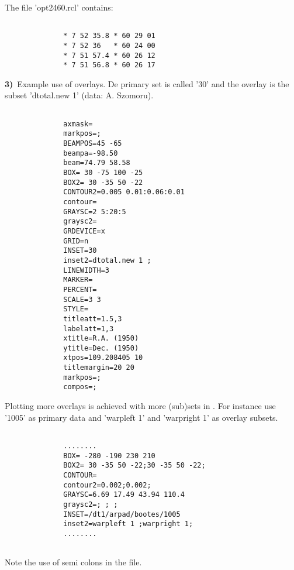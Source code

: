               The file 'opt2460.rcl' contains:

\begin{verbatim}

              * 7 52 35.8 * 60 29 01
              * 7 52 36   * 60 24 00
              * 7 51 57.4 * 60 26 12
              * 7 51 56.8 * 60 26 17

\end{verbatim}

              {\bf 3)}\  Example use of overlays. De primary set is called
                '30' and the overlay is the subset 'dtotal.new 1'
                 (data: A. Szomoru).

\begin{verbatim}

              axmask=
              markpos=;
              BEAMPOS=45 -65
              beampa=-98.50
              beam=74.79 58.58
              BOX= 30 -75 100 -25
              BOX2= 30 -35 50 -22
              CONTOUR2=0.005 0.01:0.06:0.01
              contour=
              GRAYSC=2 5:20:5
              graysc2=
              GRDEVICE=x
              GRID=n
              INSET=30 
              inset2=dtotal.new 1 ;
              LINEWIDTH=3
              MARKER=
              PERCENT=
              SCALE=3 3
              STYLE=
              titleatt=1.5,3
              labelatt=1,3
              xtitle=R.A. (1950)
              ytitle=Dec. (1950)
              xtpos=109.208405 10
              titlemargin=20 20
              markpos=;
              compos=;

\end{verbatim}


              Plotting more overlays is achieved with more (sub)sets in 
              . For instance use '1005' as primary data and
              'warpleft 1' and 'warpright 1' as overlay subsets. 
             

\begin{verbatim}

              ........
              BOX= -280 -190 230 210
              BOX2= 30 -35 50 -22;30 -35 50 -22;
              CONTOUR=
              contour2=0.002;0.002;
              GRAYSC=6.69 17.49 43.94 110.4 
              graysc2=; ; ;
              INSET=/dt1/arpad/bootes/1005
              inset2=warpleft 1 ;warpright 1;
              ........
      
\end{verbatim}
        
              Note the use of semi colons in the file.\bigskip

